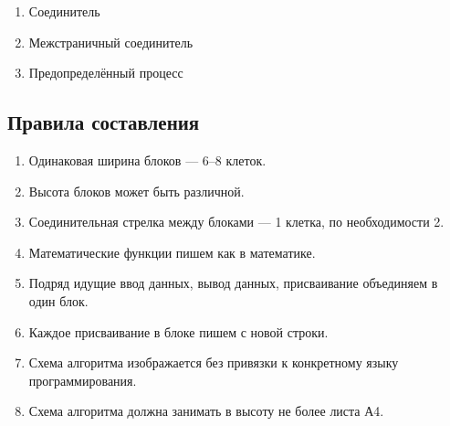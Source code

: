 \documentclass[a4paper, 12pt]{article}
\begin{document}
\begin{enumerate}[label=\arabic*)]
  \item \Needspace{3cm}Соединитель
    \begin{center}
    \end{center}

  \item \Needspace{3cm}Межстраничный соединитель
    \begin{center}
    \end{center}

  \item \Needspace{3cm}Предопределённый процесс
    \begin{center}
    \end{center}
\end{enumerate}

\subsection*{Правила составления}

\begin{enumerate}[noitemsep, label=\arabic*)]
  \item Одинаковая ширина блоков --- 6--8 клеток.
  \item Высота блоков может быть различной.
  \item Соединительная стрелка между блоками --- 1 клетка, по необходимости 2.
  \item Математические функции пишем как в математике.
  \item Подряд идущие ввод данных, вывод данных, присваивание объединяем
    в один блок.
  \item Каждое присваивание в блоке пишем с новой строки.
  \item Схема алгоритма изображается без привязки к конкретному языку
    программирования.
  \item Схема алгоритма должна занимать в высоту не более листа А4.
\end{enumerate}
\end{document}
